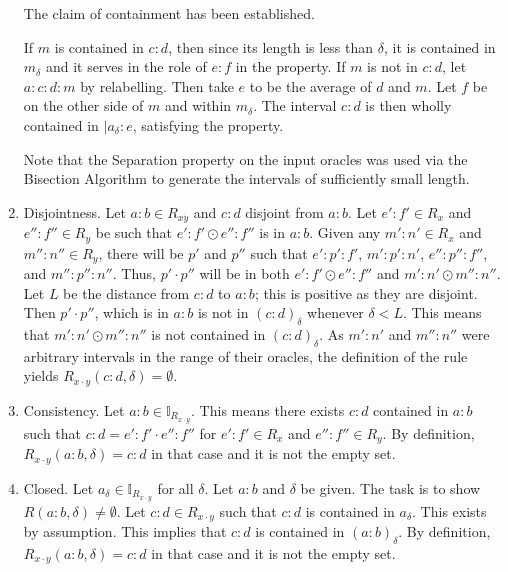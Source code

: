 \documentclass[12pt]{article}
\begin{document}
\begin{enumerate}
    The claim of containment has been established. 

    If $m$ is contained in $c:d$, then since its length is less than $\delta$, it is contained in $m_\delta$ and it serves in the role of $e:f$ in the property. If $m$ is not in $c:d$, let $a:c:d:m$ by relabelling. Then take $e$ to be the average of $d$ and $m$. Let $f$ be on the other side of $m$ and within $m_\delta$. The interval $c:d$ is then wholly contained in $|a_\delta:e$, satisfying the property. 

    Note that the Separation property on the input oracles was used via the Bisection Algorithm to generate the intervals of sufficiently small length. 
    
    \item Disjointness. Let $a:b \in R_{x\dot y}$ and $c:d$ disjoint from $a:b$. Let $e':f' \in R_x$ and $e'':f'' \in R_y$ be such that $e':f' \odot e'':f''$ is in $a:b$. Given any $m':n' \in R_x$ and $m'':n'' \in R_y$, there will be $p'$ and $p''$ such that $e':p':f'$, $m':p':n'$, $e'':p'':f''$, and $m'':p'':n''$. Thus, $p' \cdot p''$ will be in both $e':f' \odot e'':f''$ and $m':n' \odot m'':n''$.  Let $L$ be the distance from $c:d$ to $a:b$; this is positive as they are disjoint. Then $p' \cdot p''$, which is in $a:b$ is not in $(c:d)_\delta$ whenever $\delta < L$. This means that $m':n' \odot m'':n''$ is not contained in $(c:d)_\delta$. As $m':n'$ and $m'':n''$ were arbitrary intervals in the range of their oracles, the definition of the rule yields $R_{x \cdot y} (c:d, \delta) = \emptyset$. 

    \item Consistency. Let $a:b \in \mathbb{I}_{R_{x\cdot y}}$. This means there exists $c:d$ contained in $a:b$ such that $c:d = e':f' \cdot e'':f''$ for $e':f' \in R_x$ and $e'':f'' \in R_y$. By definition, $R_{x \cdot y}(a:b,\delta) = c:d$ in that case and it is not the empty set. 
        
    \item Closed.  Let $a_\delta \in \mathbb{I}_{R_{x\cdot y}}$ for all $\delta$. Let $a:b$ and $\delta$ be given. The task is to show $R(a:b, \delta) \neq \emptyset$. Let $c:d \in R_{x \cdot y}$ such that $c:d$ is contained in $a_\delta$. This exists by assumption. This implies that $c:d$ is contained in $(a:b)_\delta$. By definition, $R_{x \cdot y}(a:b,\delta) = c:d$ in that case and it is not the empty set.  
\end{enumerate}
\end{document}
